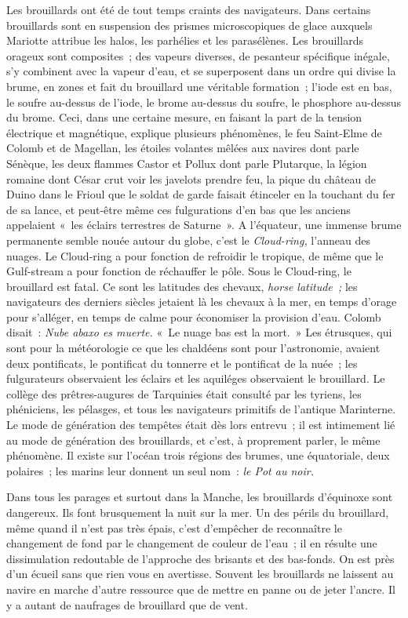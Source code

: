 \documentclass[french,twoside]{book} %
\begin{document}
Les brouillards ont été de tout temps craints des navigateurs. Dans certains brouillards sont en suspension des prismes microscopiques de glace auxquels  Mariotte attribue les halos, les parhélies et les parasélènes. Les brouillards orageux sont composites ; des vapeurs diverses, de pesanteur spécifique inégale, s’y combinent avec la vapeur d’eau, et se superposent dans un ordre qui divise la brume, en zones et fait du brouillard une véritable formation ; l’iode est en bas, le soufre au-dessus de l’iode, le brome au-dessus du soufre, le phosphore au-dessus du brome. Ceci, dans une certaine mesure, en faisant la part de la tension électrique et magnétique, explique plusieurs phénomènes, le feu Saint-Elme de Colomb et de Magellan, les étoiles volantes mêlées aux navires dont parle Sénèque, les deux flammes Castor et Pollux dont parle Plutarque, la légion romaine dont César crut voir les javelots prendre feu, la pique du château de Duino dans le Frioul que le soldat de garde faisait étinceler en la touchant du fer de sa lance, et peut-être même ces fulgurations d’en bas que les anciens appelaient « les éclairs terrestres de Saturne ». A l’équateur, une immense brume permanente semble nouée autour du globe, c’est le \emph{Cloud-ring,} l’anneau des nuages. Le Cloud-ring a pour fonction de refroidir le tropique, de même que le Gulf-stream a pour fonction de réchauffer le pôle. Sous le Cloud-ring, le brouillard est fatal. Ce sont les latitudes des chevaux, \emph{horse latitude ;} les navigateurs des derniers siècles jetaient là les chevaux à la mer, en temps d’orage pour s’alléger, en temps de calme pour économiser la provision d’eau. Colomb disait : \emph{Nube abaxo es muerte.} « Le nuage bas est la mort. » Les étrusques, qui sont pour la météorologie  ce que les chaldéens sont pour l’astronomie, avaient deux pontificats, le pontificat du tonnerre et le pontificat de la nuée ; les fulgurateurs observaient les éclairs et les aquiléges observaient le brouillard. Le collège des prêtres-augures de Tarquinies était consulté par les tyriens, les phéniciens, les pélasges, et tous les navigateurs primitifs de l’antique Marinterne. Le mode de génération des tempêtes était dès lors entrevu ; il est intimement lié au mode de génération des brouillards, et c’est, à proprement parler, le même phénomène. Il existe sur l’océan trois régions des brumes, une équatoriale, deux polaires ; les marins leur donnent un seul nom : \emph{le Pot au noir.}\par
Dans tous les parages et surtout dans la Manche, les brouillards d’équinoxe sont dangereux. Ils font brusquement la nuit sur la mer. Un des périls du brouillard, même quand il n’est pas très épais, c’est d’empêcher de reconnaître le changement de fond par le changement de couleur de l’eau ; il en résulte une dissimulation redoutable de l’approche des brisants et des bas-fonds. On est près d’un écueil sans que rien vous en avertisse. Souvent les brouillards ne laissent au navire en marche d’autre ressource que de mettre en panne ou de jeter l’ancre. Il y a autant de naufrages de brouillard que de vent.\par
\end{document}
